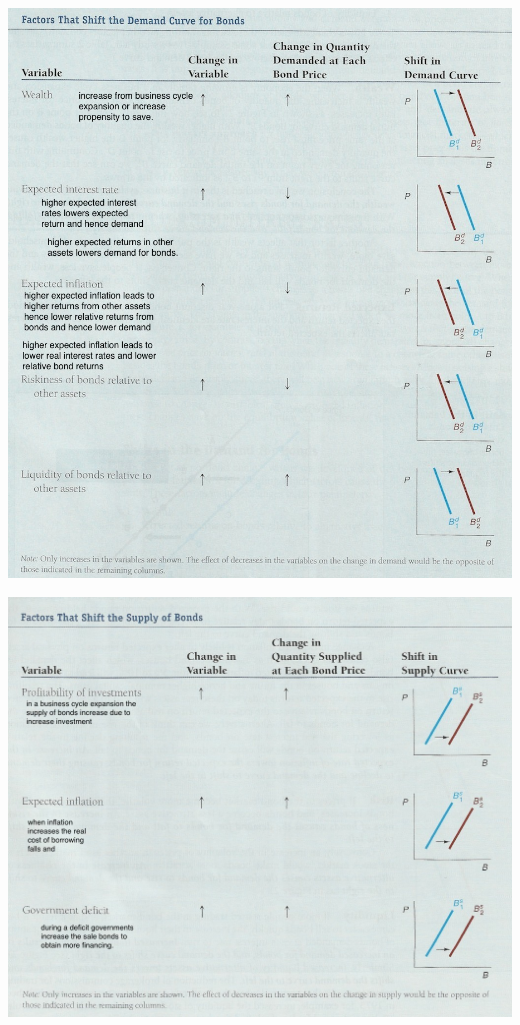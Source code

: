 \documentclass[12pt]{examnotes}
\begin{document}
\begin{center}
  \includegraphics[scale=0.5]{./imgs/demandshift.jpg}
\end{center}
\begin{center}
  \includegraphics[scale=0.5]{./imgs/supplyshift.jpg}
\end{center}
\end{document}
